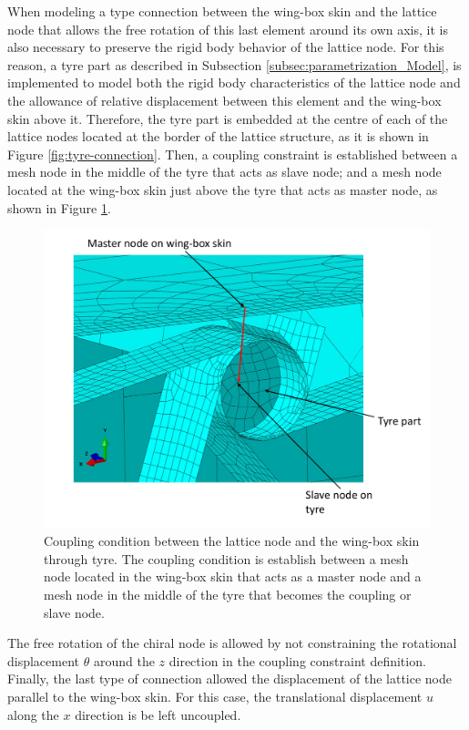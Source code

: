     When modeling a type connection between the wing-box skin and the lattice node that allows the free rotation of this last element around its own axis, it is also necessary to preserve the rigid body behavior of the lattice node. For this reason, a tyre part as described in Subsection \ref{subsec:parametrization_Model}, is implemented to model both the rigid body characteristics of the lattice node and the allowance of relative displacement between this element and the wing-box skin above it. Therefore, the tyre part is embedded at the centre of each of the lattice nodes located at the border of the lattice structure, as it is shown in Figure \ref{fig:tyre-connection}. Then, a coupling constraint is established between a mesh node in the middle of the tyre that acts as slave node; and a mesh node located at the wing-box skin just above the tyre that acts as master node, as shown in Figure \ref{fig:connection-tyre}.

    \begin{figure}[!htpb]
      \centering
      \includegraphics[width=0.7 \textwidth]{figures/model/connection-tyre}
      \caption[Coupling condition between the lattice node and the wing-box skin through tyre]{Coupling condition between the lattice node and the wing-box skin through tyre. The coupling condition is establish between a mesh node located in the wing-box skin that acts as a master node and a mesh node in the middle of the tyre that becomes the coupling or slave node.}\label{fig:connection-tyre}
    \end{figure}

    The free rotation of the chiral node is allowed by not constraining the rotational displacement $\theta$ around the $z$ direction in the coupling constraint definition. Finally, the last type of connection allowed the displacement of the lattice node parallel to the wing-box skin. For this case, the translational displacement $u$ along the $x$ direction is be left uncoupled.


